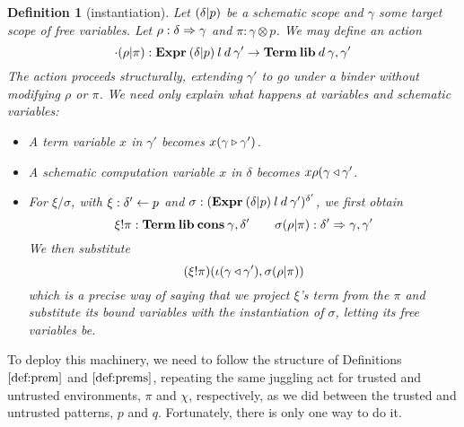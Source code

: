 \documentclass{jfp1}
\newtheorem{definition}[theorem]{Definition}
\newcommand{\fsl}{\texttt{/}}
\begin{document}
\begin{definition}[instantiation]
  Let $(\delta|p)$ be a schematic scope and $\gamma$ some target
  scope of free variables. Let  $\rho : \delta\Rightarrow\gamma$ and $\pi :
  \gamma\otimes p$. We may define an action
  \[
    \cdot(\rho|\pi) : \textbf{Expr}\:(\delta|p)\:l\:d\:\gamma' \to
      \mathbf{Term}\:\textbf{lib}\:d\:\gamma,\gamma'
  \]
  The action proceeds structurally, extending $\gamma'$ to go under a
  binder without modifying $\rho$ or $\pi$. We need only explain what
  happens at variables and schematic variables:
  \begin{itemize}
    \item A term variable $x$ in $\gamma'$ becomes
      $x(\gamma \triangleright \gamma')$.
    \item A schematic computation variable $x$ in $\delta$ becomes
      $x\rho(\gamma \triangleleft \gamma'$.
    \item For $\xi\fsl\sigma$, with $\xi:\delta'\leftarrow p$ and
      $\sigma:(\textbf{Expr}\:(\delta|p)\:l\:d\:\gamma')^{\delta'}$, we first
      obtain
      \[
        \xi!\pi : \mathbf{Term}\:\textbf{lib}\:\textbf{cons}\:\gamma,\delta' \qquad
        \sigma(\rho|\pi) : \delta'\Rightarrow\gamma,\gamma'
      \]
      We then substitute
      \[
        (\xi!\pi)(\iota(\gamma \triangleleft \gamma'),\sigma(\rho|\pi))
      \]
      which is a precise way of saying that we project $\xi$'s
      term from the $\pi$ and substitute its bound variables
      with the instantiation of $\sigma$, letting its free variables be.
  \end{itemize}
\end{definition}

To deploy this machinery, we need to follow the structure of
Definitions $\ref{def:prem}$ and $\ref{def:prems}$, repeating the same
juggling act for trusted and untrusted environments, $\pi$ and $\chi$,
respectively, as we did between the trusted and untrusted patterns,
$p$ and $q$. Fortunately, there is only one way to do it.
\end{document}
